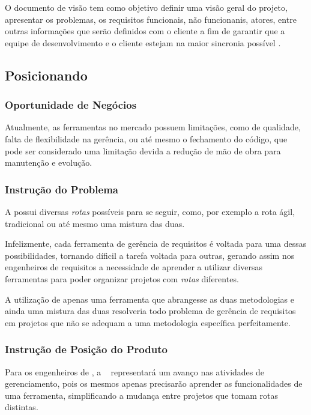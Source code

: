 
O documento de visão tem como objetivo definir uma visão geral do projeto, apresentar os problemas, os requisitos funcionais, não funcionanis, atores, entre outras informações que serão definidos com o cliente a fim de garantir que a equipe de desenvolvimento e o cliente estejam na maior sincronia possível \cite{IBM:2014:Online}.

\subsection{Posicionando}
\subsubsection{Oportunidade de Negócios}

Atualmente, as ferramentas no mercado possuem limitações, como de qualidade, falta de flexibilidade na gerência, ou até mesmo o fechamento do código, que pode ser considerado uma limitação devida a redução de mão de obra para manutenção e evolução.

\subsubsection{Instrução do Problema}

A \er{} possui diversas \textit{rotas} possíveis para se seguir, como, por exemplo a rota ágil, tradicional ou até mesmo uma mistura das duas.

Infelizmente, cada ferramenta de gerência de requisitos é voltada para uma dessas possibilidades, tornando díficil a tarefa voltada para outras, gerando assim nos engenheiros de requisitos a necessidade de aprender a utilizar diversas ferramentas para poder organizar projetos com \textit{rotas} diferentes.

A utilização de apenas uma ferramenta que abrangesse as duas metodologias e ainda uma mistura das duas resolveria todo problema de gerência de requisitos em projetos que não se adequam a uma metodologia específica perfeitamente.

\subsubsection{Instrução de Posição do Produto}

Para os engenheiros de \er, a \nomeferramenta~ representará um avanço nas atividades de gerenciamento, pois os mesmos apenas precisarão aprender as funcionalidades de uma ferramenta, simplificando a mudança entre projetos que tomam rotas distintas.

